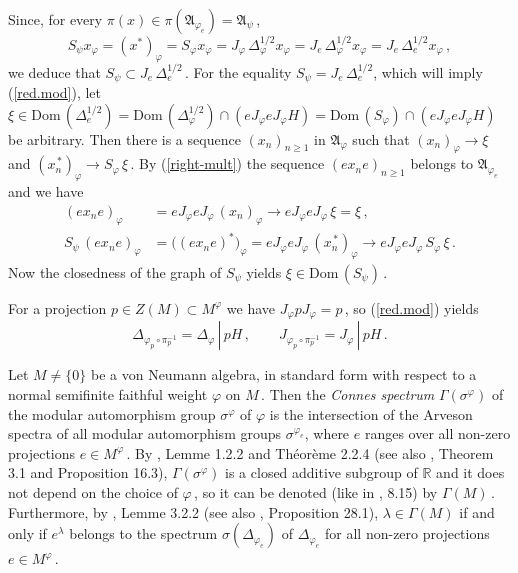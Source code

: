 \documentclass[reqno]{amsart}
\theoremstyle{definition}
\theoremstyle{remark}
\numberwithin{equation}{section}
\theoremstyle{plain}
\begin{document}
Since, for every $\pi (x)\in\pi (\mathfrak A_{\varphi_e}) =
\mathfrak A_\psi\,$,
\begin{equation*}
S_\psi x_\varphi =(x^*)_\varphi = S_\varphi x_\varphi =J_\varphi\,
\Delta_\varphi^{1/2} x_\varphi =J_e\,\Delta_\varphi^{1/2} x_\varphi
=J_e\,\Delta_e^{1/2}x_\varphi\, ,
\end{equation*}
we deduce that $S_\psi\subset J_e\,\Delta_e^{1/2}\,$. For the
equality $S_\psi =J_e\,\Delta_e^{1/2}$, which will imply
(\ref{red.mod}), let $\xi\in\text{Dom}\, (\Delta_e^{1/2}) =
\text{Dom}\, (\Delta_\varphi^{1/2})\cap (eJ_\varphi eJ_\varphi H)
=\text{Dom}\, (S_\varphi )\cap (e J_\varphi e J_\varphi H)$
be arbitrary. Then there is a sequence $(x_n)_{n\geq 1}$ in
$\mathfrak A_\varphi$ such that $(x_n)_\varphi\longrightarrow\xi$
and $(x_n^{\, *})_\varphi\longrightarrow S_\varphi\,\xi\,$.
By (\ref{right-mult}) the sequence $(e x_n e)_{n\geq 1}$ belongs
to $\mathfrak A_{\varphi_e}$ and we have
\begin{align*}
(e x_n e)_\varphi &=eJ_\varphi eJ_\varphi\,(x_n)_\varphi
\longrightarrow eJ_\varphi eJ_\varphi\,\xi =\xi\, , \\
S_\psi\, (e x_n e)_\varphi &=\big( (e x_n e)^*\big)_\varphi =
eJ_\varphi eJ_\varphi\, (x_n^{\, *})_\varphi
\longrightarrow eJ_\varphi eJ_\varphi\, S_\varphi\,\xi\, .
\end{align*}
Now the closedness of the graph of $S_\psi$ yields $\xi\in
\text{Dom}\, (S_\psi )\,$.

For a projection $p\in Z(M)\subset M^\varphi$ we have $J_\varphi
p J_\varphi =p\,$, so (\ref{red.mod}) yields
\begin{equation}\label{centr.red.mod}
\Delta_{\varphi_p\circ\pi_p^{-1}} =\Delta_\varphi\, |\, p H\, ,
\qquad J_{\varphi_p\circ\pi_p^{-1}} = J_\varphi\, |\, p H\, .
\end{equation}

Let $M\neq\{ 0\}$ be a von Neumann algebra, in standard form
with respect to a normal semifinite faithful weight $\varphi$
on $M\,$. Then the \emph{Connes spectrum} $\Gamma (\sigma^\varphi )$
of the modular automorphism group $\sigma^\varphi$ of $\varphi$
is the intersection of the Arveson spectra of all modular
automorphism groups $\sigma^{\varphi_e}$, where $e$ ranges over
all non-zero projections $e\in M^\varphi\,$. By \cite{Co},
Lemme 1.2.2 and Th\'eor\`eme 2.2.4 (see also \cite{S}, Theorem 3.1
and Proposition 16.3), $\Gamma (\sigma^\varphi )$ is a closed
additive subgroup of $\mathbb R$ and it does not depend on
the choice of $\varphi\,$, so it can be denoted (like in \cite{P},
8.15) by $\Gamma (M)\,$. Furthermore, by \cite{Co}, Lemme 3.2.2
(see also \cite{S}, Proposition 28.1), $\lambda\in\Gamma (M)$
if and only if $e^\lambda$ belongs to the spectrum $\sigma
(\Delta_{\varphi_e})$ of $\Delta_{\varphi_e}$ for all non-zero
projections $e\in M^\varphi\,$.
\end{document}
